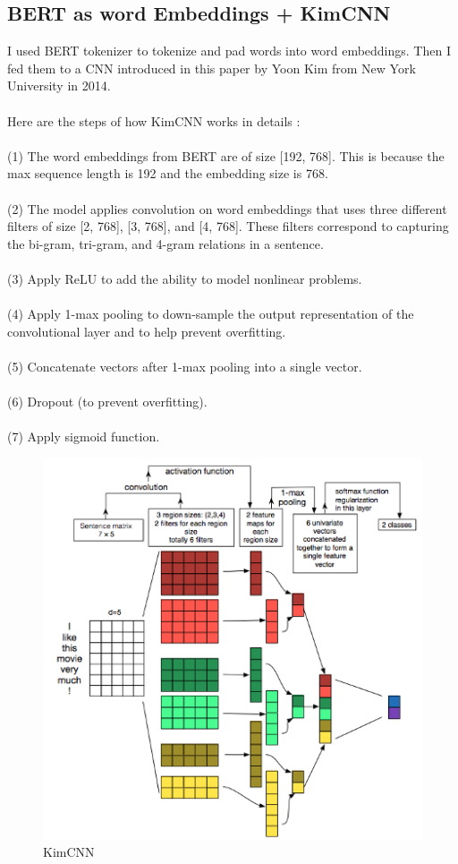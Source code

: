 \documentclass[11pt,a4paper]{article}
\begin{document}
\subsection{BERT as word Embeddings + KimCNN}

I used BERT tokenizer to tokenize and pad words into word embeddings. Then I fed them  to a CNN introduced in this paper \cite{kimcnn} by Yoon Kim from New York University in 2014.\\
\\
Here are the steps of how KimCNN works in details \cite{kimcnn}:\\
\\
(1) The word embeddings from BERT are of size [192, 768]. This is because the max sequence length is 192 and the embedding size is 768.\\
\\
(2) The model applies convolution on word embeddings that uses three different filters of size [2, 768], [3, 768], and [4, 768]. These filters correspond to capturing the bi-gram, tri-gram, and 4-gram relations in a sentence.\\
\\
(3) Apply ReLU to add the ability to model nonlinear problems.\\
\\
(4) Apply 1-max pooling to down-sample the output representation of the convolutional layer and to help prevent overfitting.\\
\\
(5) Concatenate vectors after 1-max pooling into a single vector.\\
\\
(6) Dropout (to prevent overfitting).\\
\\
(7) Apply sigmoid function.\\

\begin{figure}[!htbp]
	\centering
	\includegraphics{figures/figure5.png}
	\caption{\label{fig:my-label} KimCNN \cite{kimcnn}}
\end{figure}
\end{document}
